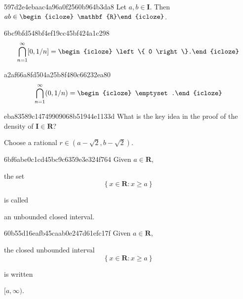 \begin{note}{597d2e4ebaac4a96a0f2560b964b3da8}
    Let \({ a, b \in \mathbf{I} }\).
    Then \({ ab \in \begin{icloze}{1}\mathbf{R}\end{icloze} }\).
\end{note}

\begin{note}{6bc9bfd548bf4ef19cc45bf424a1c298}
    \[
        \bigcap_{n = 1}^{\infty} [0, 1/n] = \begin{icloze}{1}\left\{ 0 \right\}.\end{icloze}
    \]
\end{note}

\begin{note}{a2af66a8fd504a25b8f480c66232ea80}
    \[
        \bigcap_{n = 1}^{\infty} (0, 1/n) = \begin{icloze}{1}\emptyset.\end{icloze}
    \]
\end{note}

\begin{note}{eba83589c14749909068b51944e1133d}
    What is the key idea in the proof of the density of \({ \mathbf{I} \in \mathbf{R} }\)?

    \begin{cloze}{1}
        Choose a rational \({ r \in (a - \sqrt{2}, b - \sqrt{2}) }\).
    \end{cloze}
\end{note}

\begin{note}{6bf6abe0c1cd45bc9c6359e3e324f764}
    Given \({ a \in \mathbf{R} }\),
    \begin{icloze}{2}
        the set
        \[
            \left\{ x \in \mathbf{R} : x \geq a \right\}
        \]
    \end{icloze}
    is called \begin{icloze}{1}an unbounded closed interval.\end{icloze}
\end{note}

\begin{note}{60b55d16eafb45caab0e247d61efc17f}
    Given \({ a \in \mathbf{R} }\),
    \begin{icloze}{2}
        the closed unbounded interval
        \[
            \left\{ x \in \mathbf{R} : x \geq a \right\}
        \]
    \end{icloze}
    is written \begin{icloze}{1}\({ [a, \infty) }\).\end{icloze}
\end{note}

